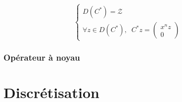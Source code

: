 \documentclass[a4paper]{article}
\begin{document}
\begin{equation}
	\begin{cases}
		D(C^*) = \mathscr{Z} \\
        \forall z \in D(C^*), \; \;
	C^* z
	= \left(\begin{array}{c}
		x^n z \\
		0
		\end{array}\right)
	\end{cases}
\end{equation}

\subsubsection{Opérateur à noyau}




\newpage
\section{Discrétisation}





\newpage
\end{document}
